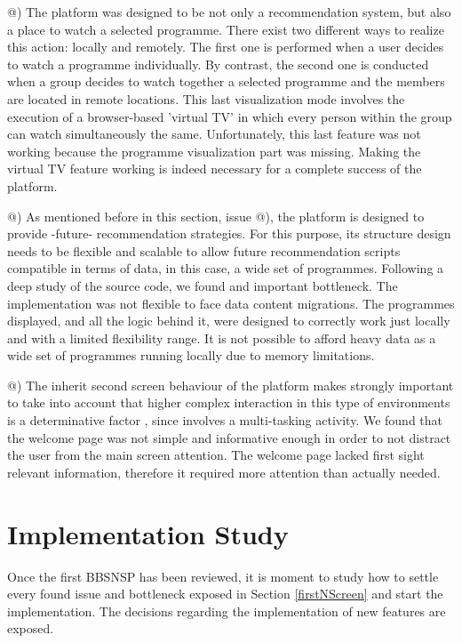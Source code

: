\documentclass{acm_proc_article-sp}
\makeatletter
\newcommand*{\rom}[1]{\expandafter\@slowromancap\romannumeral #1@}
\makeatother
\begin{document}
\rom{4}) The platform was designed to be not only a recommendation system, but also a place to watch a selected programme. There exist two different ways to realize this action: locally and remotely. 
The first one is performed when a user decides to watch a programme individually. By contrast, the second one is conducted when a group decides to watch together a selected programme and the members are located in remote locations. This last visualization mode involves the execution of a browser-based 'virtual TV' in which every person within the group can watch simultaneously the same. Unfortunately,  this last feature was not working because the programme visualization part was missing. Making the virtual TV feature working is indeed necessary for a complete success of the platform. 

\rom{5}) As mentioned before in this section, issue \rom{1}), the platform is designed to provide -future- recommendation strategies. For this purpose, its  structure design needs to be flexible and scalable to allow future recommendation scripts compatible in terms of data, in this case, a wide set of programmes. Following a deep study of the source code, we found and important bottleneck. The implementation was not flexible to face data content migrations. The programmes displayed, and all the logic behind it, were designed to correctly work just locally and with a limited flexibility range. It is not possible to afford heavy data as a wide set of programmes running locally due to memory limitations. 


\rom{6}) The inherit second screen behaviour of the platform makes strongly important to take into account that higher complex interaction in this type of environments is a determinative factor \cite{cruickshank2007making}, since involves a multi-tasking activity. We found that the welcome page was not simple and informative enough in order to not distract the user from the main screen attention. The welcome page lacked first sight relevant information, therefore it required more attention than actually needed. 

\section{Implementation Study}
Once the first BBSNSP has been reviewed, it is moment to study how to settle every found issue and bottleneck exposed in Section \ref{firstNScreen} and start the implementation. The decisions regarding the implementation of new features are exposed. 
\end{document}
